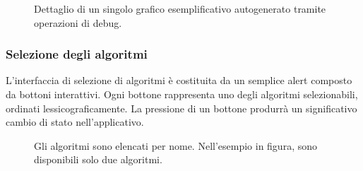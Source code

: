 \begin{figure}[ht!]
    \centering
    \caption{Dettaglio di un singolo grafico esemplificativo autogenerato tramite operazioni di debug.}
    \label{fig:esempio}
\end{figure}

\subsubsection{Selezione degli algoritmi}

L'interfaccia di selezione di algoritmi è costituita da un semplice alert composto da bottoni interattivi. Ogni bottone rappresenta uno degli algoritmi selezionabili, ordinati lessicograficamente. La pressione di un bottone produrrà un significativo cambio di stato nell'applicativo.

\begin{figure}[ht!]
    \centering
    \caption{Gli algoritmi sono elencati per nome. Nell'esempio in figura, sono disponibili solo due algoritmi.}
    \label{fig:esempio}
\end{figure}

